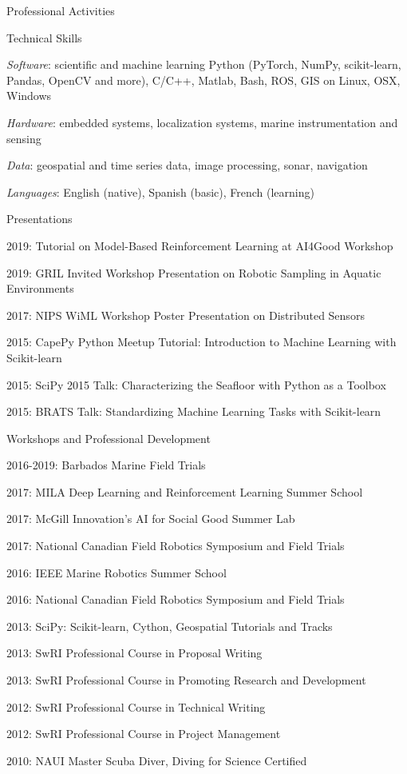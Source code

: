 \documentclass{resume} %
\begin{document}
\begin{rSection}{Professional Activities}
\begin{rSubsection}{Technical Skills}{}{}{}
\item{\emph{Software}: scientific and machine learning Python (PyTorch, NumPy, scikit-learn, Pandas, OpenCV and more), C/C++, Matlab, Bash, ROS, GIS on Linux, OSX, Windows}
\item{\emph{Hardware}: embedded systems, localization systems, marine instrumentation and sensing}
\item{\emph{Data}: geospatial and time series data, image processing, sonar, navigation }
\item{\emph{Languages}: English (native), Spanish (basic), French (learning)}
\end{rSubsection}

\begin{rSubsection}{Presentations}{}{}{}
\item{2019: Tutorial on Model-Based Reinforcement Learning at AI4Good Workshop}
\item{2019: GRIL Invited Workshop Presentation on Robotic Sampling in Aquatic Environments}
\item{2017: NIPS WiML Workshop Poster Presentation on Distributed Sensors}
\item{2015: CapePy Python Meetup Tutorial: Introduction to Machine Learning with Scikit-learn }
\item{2015: SciPy 2015 Talk: Characterizing the Seafloor with Python as a Toolbox}
\item{2015: BRATS Talk: Standardizing Machine Learning Tasks with Scikit-learn }
\end{rSubsection}

\begin{rSubsection}{Workshops and Professional Development}{}{}{}
\item{2016-2019: Barbados Marine Field Trials}
\item{2017: MILA Deep Learning and Reinforcement Learning Summer School}
\item{2017: McGill Innovation's AI for Social Good Summer Lab}
\item{2017: National Canadian Field Robotics Symposium and Field Trials}
\item{2016: IEEE Marine Robotics Summer School}
\item{2016: National Canadian Field Robotics Symposium and Field Trials}
\item{2013: SciPy: Scikit-learn, Cython, Geospatial Tutorials and Tracks}
\item{2013: SwRI Professional Course in Proposal Writing}
\item{2013: SwRI Professional Course in Promoting Research and Development}
\item{2012: SwRI Professional Course in Technical Writing}
\item{2012: SwRI Professional Course in Project Management}
\item{2010: NAUI Master Scuba Diver, Diving for Science Certified}
\end{rSubsection}



\end{rSection}
\end{document}
